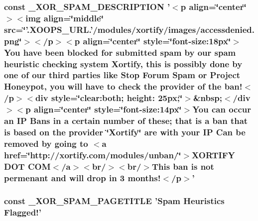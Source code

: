 \hypertarget{ban_8php_a8a623b5761ef811e78d8269b3c36f56c}{
\subsubsection[{\-\_\-\-X\-O\-R\-\_\-\-S\-P\-A\-M\-\_\-\-D\-E\-S\-C\-R\-I\-P\-T\-I\-O\-N}]{\setlength{\rightskip}{0pt plus 5cm}const \-\_\-\-X\-O\-R\-\_\-\-S\-P\-A\-M\-\_\-\-D\-E\-S\-C\-R\-I\-P\-T\-I\-O\-N '$<$p align=\char`\"{}center\char`\"{}$>$$<$img align=\char`\"{}middle\char`\"{} src=\char`\"{}'.X\-O\-O\-P\-S\-\_\-\-U\-R\-L.'/modules/xortify/images/accessdenied.\-png\char`\"{}$>$$<$/p$>$$<$p align=\char`\"{}center\char`\"{} style=\char`\"{}font-\/size\-:18px\char`\"{}$>$You have been blocked for submitted spam by our spam heuristic checking system Xortify, this is possibly done by one of our third parties like Stop Forum Spam or Project Honeypot, you will have to check the provider of the ban!$<$/p$>$$<$div style=\char`\"{}clear\-:both; height\-: 25px;\char`\"{}$>$\&nbsp;$<$/div$>$$<$p align=\char`\"{}center\char`\"{} style=\char`\"{}font-\/size\-:14px\char`\"{}$>$\-You can occur an I\-P Bans in a certain number of these; that is a ban that is based on the provider \char`\"{}\-Xortify\char`\"{} are with your I\-P Can be removed by going to $<$a href=\char`\"{}http\-://xortify.\-com/modules/unban/\char`\"{}$>$\-X\-O\-R\-T\-I\-F\-Y D\-O\-T C\-O\-M$<$/a$>$$<$br/$>$$<$br/$>$\-This ban is not permenant and will drop in 3 months!$<$/p$>$'}}\label{ban_8php_a8a623b5761ef811e78d8269b3c36f56c}
\hypertarget{ban_8php_aeef3756f11e3ee4fedde08147263640d}{
\subsubsection[{\-\_\-\-X\-O\-R\-\_\-\-S\-P\-A\-M\-\_\-\-P\-A\-G\-E\-T\-I\-T\-L\-E}]{\setlength{\rightskip}{0pt plus 5cm}const \-\_\-\-X\-O\-R\-\_\-\-S\-P\-A\-M\-\_\-\-P\-A\-G\-E\-T\-I\-T\-L\-E 'Spam Heuristics Flagged!'}}\label{ban_8php_aeef3756f11e3ee4fedde08147263640d}
